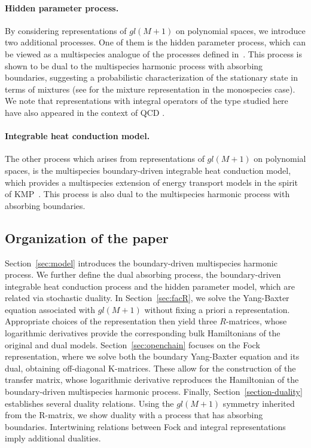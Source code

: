 \documentclass[11pt]{article}
\numberwithin{equation}{section}
\begin{document}
\paragraph{Hidden parameter process.}
By considering representations of $gl(M+1)$ on polynomial spaces, we introduce two additional processes.
One of them is 
the hidden parameter process, which can be viewed as a multispecies analogue of the processes defined in~\cite{2025JSP...192...21G}. This process is 
shown to be dual to the multispecies harmonic process with absorbing boundaries, suggesting a probabilistic characterization of the stationary state in terms of mixtures (see \cite{2024JSP...191..150D,2025JSP...192...21G} for the mixture representation in the monospecies case). We note that representations with integral operators of the type studied here have also appeared in the context of QCD \cite{Lipatov:1993yb,Faddeev:1994zg,Braun:1999te}.


\paragraph{Integrable heat conduction model.}

The other process which arises
from representations of $gl(M+1)$ on polynomial spaces,
is the multispecies boundary-driven integrable heat conduction model, which provides a multispecies extension of energy transport models in the spirit of KMP~\cite{kipnis1982heat}.
This process is 
also dual to the multispecies harmonic process with absorbing boundaries.



 


\subsection{Organization of the paper} Section~\ref{sec:model} introduces the boundary-driven multispecies harmonic process. We further define the dual absorbing process, the boundary-driven integrable heat conduction process and the hidden parameter model, which are related via stochastic duality.
In Section~\ref{sec:facR}, we solve the Yang-Baxter equation associated with $gl(M+1)$ without fixing a priori a representation. Appropriate choices of the representation then yield three $R$-matrices, whose logarithmic derivatives provide the corresponding bulk Hamiltonians of the original and dual models.
Section~\ref{sec:openchain} focuses on the Fock representation, where we solve both the boundary Yang-Baxter equation and its dual, obtaining off-diagonal K-matrices. These allow for the construction of the transfer matrix, whose logarithmic derivative reproduces the Hamiltonian of the boundary-driven multispecies harmonic process.
Finally, Section~\ref{section-duality} establishes several duality relations. Using the $gl(M+1)$ symmetry inherited from the R-matrix, we show duality with a process that has absorbing boundaries. Intertwining relations between Fock and integral representations imply additional dualities.
 
\end{document}
